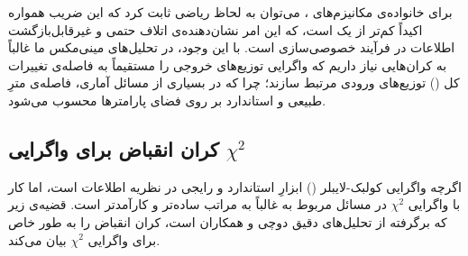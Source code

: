 برای خانواده‌ی مکانیزم‌های \LDP، می‌توان به لحاظ ریاضی ثابت کرد که این ضریب همواره اکیداً کم‌تر از یک است، که این امر نشان‌دهنده‌ی اتلاف حتمی و غیرقابل‌بازگشت اطلاعات در فرآیند خصوصی‌سازی است. با این وجود، در تحلیل‌های مینی‌مکس ما غالباً به کران‌هایی نیاز داریم که واگرایی توزیع‌های خروجی را مستقیماً به فاصله‌ی تغییرات کل () توزیع‌های ورودی مرتبط سازند؛ چرا که در بسیاری از مسائل آماری، فاصله‌ی  مترِ طبیعی و استاندارد بر روی فضای پارامترها محسوب می‌شود.

\subsection{کران انقباض برای واگرایی $\chi^2$}
اگرچه واگرایی کولبک-لایبلر () ابزارِ استاندارد و رایجی در نظریه اطلاعات است، اما کار با واگرایی $\chi^2$ در مسائل مربوط به  غالباً به مراتب ساده‌تر و کارآمدتر است. قضیه‌ی زیر که برگرفته از تحلیل‌های دقیق دوچی و همکاران \cite{Duchi2013} است، کران انقباض را به طور خاص برای واگرایی $\chi^2$ بیان می‌کند.

